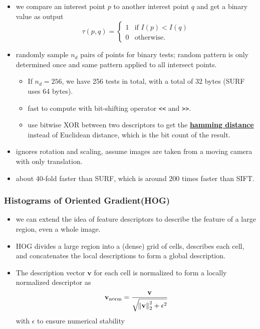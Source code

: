 \documentclass[twocolumn,landscape,10pt]{article}
\theoremstyle{definition}
\begin{document}
\begin{itemize}
    \item we compare an interest point $p$ to another interest point $q$
        and get a binary value as output
        \[
            \tau(p,q)=
            \begin{cases}
                1 & \text{if }I(p)<I(q) \\
                0 & \text{otherwise}.
            \end{cases} 
        \]
    \item randomly sample $n_d$ pairs of points for binary tests; random pattern
        is only determined once and same pattern applied to all intersect
        points.
        \begin{itemize}
            \item If $n_d=256$, we have 256 tests in total, with a total of 32
                bytes (SURF uses 64 bytes).
            \item fast to compute with bit-shifting operator \texttt{<<} and
                \texttt{>>}.
            \item use bitwise XOR between two descriptors to get the
                \underline{\textbf{hamming distance}} instead of Euclidean
                distance, which is the bit count of the result.
        \end{itemize} 
    \item ignores rotation and scaling, assume images are taken from a moving
        camera with only translation.
    \item about 40-fold faster than SURF, which is around 200 times faster than
        SIFT.
\end{itemize} 

\subsubsection{Histograms of Oriented Gradient(HOG)}

\begin{itemize}
    \item we can extend the idea of feature descriptors to describe the feature
        of a large region, even a whole image.
    \item HOG divides a large region into a (dense) grid of cells, describes
        each cell, and concatenates the local descriptions to form a global
        description.
    \item The description vector $\mathbf{v}$ for each cell is normalized to form a
        locally normalized descriptor as
        \[
            \mathbf{v}_\text{norm}=\frac{\mathbf{v}}{\sqrt{\norm{\mathbf{v}}^2_2+\epsilon^2}}
        \]
        with $\epsilon$ to ensure numerical stability
\end{itemize} 
\end{document}
